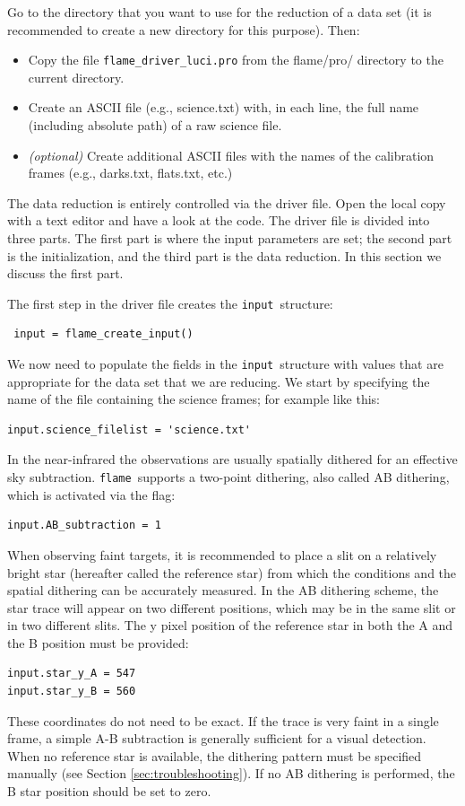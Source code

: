 \documentclass[a4paper, notitlepage]{article}
\newcommand{\flame}{\texttt{flame}}
\newcommand{\inp}{\texttt{input}}
\begin{document}
Go to the directory that you want to use for the reduction of a data set (it is recommended to create a new directory for this purpose). Then:
\begin{itemize}
\item Copy the file \texttt{flame\_driver\_luci.pro} from the flame/pro/ directory to the current directory.
\item Create an ASCII file (e.g., science.txt) with, in each line, the full name (including absolute path) of a raw science file.
\item \emph{(optional)} Create additional ASCII files with the names of the calibration frames (e.g., darks.txt, flats.txt, etc.)
\end{itemize}

The data reduction is entirely controlled via the driver file. Open the local copy with a text editor and have a look at the code. The driver file is divided into three parts. The first part is where the input parameters are set; the second part is the initialization, and the third part is the data reduction. In this section we discuss the first part.

The first step in the driver file creates the \inp\ structure:
\begin{lstlisting}
 input = flame_create_input()
\end{lstlisting}
We now need to populate the fields in the \inp\ structure with values that are appropriate for the data set that we are reducing.
We start by specifying the name of the file containing the science frames; for example like this:
\begin{lstlisting}
input.science_filelist = 'science.txt'
\end{lstlisting}

In the near-infrared the observations are usually spatially dithered for an effective sky subtraction. \flame\ supports a two-point dithering, also called AB dithering, which is activated via the flag:
\begin{lstlisting}
input.AB_subtraction = 1
\end{lstlisting}

When observing faint targets, it is recommended to place a slit on a relatively bright star (hereafter called the reference star) from which the conditions and the spatial dithering can be accurately measured. In the AB dithering scheme, the star trace will appear on two different positions, which may be in the same slit or in two different slits. The y pixel position of the reference star in both the A and the B position must be provided:
\begin{lstlisting}
input.star_y_A = 547
input.star_y_B = 560
\end{lstlisting}
These coordinates do not need to be exact. If the trace is very faint in a single frame, a simple A-B subtraction is generally sufficient for a visual detection. When no reference star is available, the dithering pattern must be specified manually (see Section \ref{sec:troubleshooting}). If no AB dithering is performed, the B star position should be set to zero.
\end{document}
